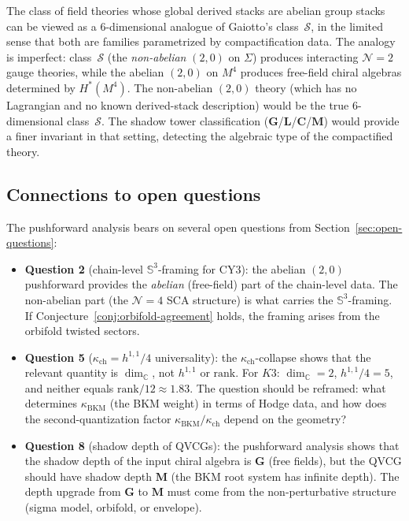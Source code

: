 \documentclass[11pt]{article}
\newcommand{\cN}{\mathcal{N}}
\newcommand{\C}{\mathbb{C}}
\newcommand{\bS}{\mathbb{S}}
\newcommand{\cS}{\mathcal{S}}
\begin{document}
\begin{remark}
\label{rem:gaiotto-class}
The class of field theories whose global derived stacks are abelian group stacks can be viewed as a $6$-dimensional analogue of Gaiotto's class~$\cS$, in the limited sense that both are families parametrized by compactification data. The analogy is imperfect: class~$\cS$ (the \emph{non-abelian} $(2,0)$ on $\Sigma$) produces interacting $\cN = 2$ gauge theories, while the abelian $(2,0)$ on $M^4$ produces free-field chiral algebras determined by $H^*(M^4)$. The non-abelian $(2,0)$ theory (which has no Lagrangian and no known derived-stack description) would be the true $6$-dimensional class~$\cS$. The shadow tower classification ($\mathbf{G}$/$\mathbf{L}$/$\mathbf{C}$/$\mathbf{M}$) would provide a finer invariant in that setting, detecting the algebraic type of the compactified theory.
\end{remark}

\subsection{Connections to open questions}
\label{subsec:pushforward-open}

The pushforward analysis bears on several open questions from Section~\ref{sec:open-questions}:

\begin{itemize}
 \item \textbf{Question 2} (chain-level $\bS^3$-framing for CY3): the abelian $(2,0)$ pushforward provides the \emph{abelian} (free-field) part of the chain-level data. The non-abelian part (the $\cN = 4$ SCA structure) is what carries the $\bS^3$-framing. If Conjecture~\ref{conj:orbifold-agreement} holds, the framing arises from the orbifold twisted sectors.

 \item \textbf{Question 5} ($\kappa_{\mathrm{ch}} = h^{1,1}/4$ universality): the $\kappa_{\mathrm{ch}}$-collapse shows that the relevant quantity is $\dim_\C$, not $h^{1,1}$ or $\mathrm{rank}$. For $K3$: $\dim_\C = 2$, $h^{1,1}/4 = 5$, and neither equals $\mathrm{rank}/12 \approx 1.83$. The question should be reframed: what determines $\kappa_{\mathrm{BKM}}$ (the BKM weight) in terms of Hodge data, and how does the second-quantization factor $\kappa_{\mathrm{BKM}} / \kappa_{\mathrm{ch}}$ depend on the geometry?

 \item \textbf{Question 8} (shadow depth of QVCGs): the pushforward analysis shows that the shadow depth of the input chiral algebra is $\mathbf{G}$ (free fields), but the QVCG should have shadow depth $\mathbf{M}$ (the BKM root system has infinite depth). The depth upgrade from $\mathbf{G}$ to $\mathbf{M}$ must come from the non-perturbative structure (sigma model, orbifold, or envelope).
\end{itemize}
\end{document}
